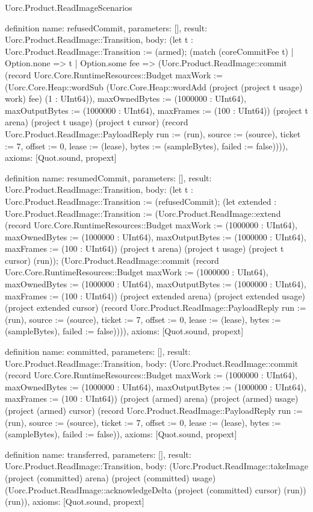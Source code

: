\begin{lexlean}{Uorc.Product.ReadImageScenarios}
\begin{semanticmodule}
definition{
  name: refusedCommit,
  parameters: [],
  result: Uorc.Product.ReadImage::Transition,
  body: (let t : Uorc.Product.ReadImage::Transition := (armed); (match (coreCommitFee t)
    | Option.none => t
    | Option.some fee => (Uorc.Product.ReadImage::commit (record Uorc.Core.RuntimeResources::Budget {maxWork := (Uorc.Core.Heap::wordSub (Uorc.Core.Heap::wordAdd (project (project t usage) work) fee) (1 : UInt64)), maxOwnedBytes := (1000000 : UInt64), maxOutputBytes := (1000000 : UInt64), maxFrames := (100 : UInt64)}) (project t arena) (project t usage) (project t cursor) (record Uorc.Product.ReadImage::PayloadReply {run := (run), source := (source), ticket := 7, offset := 0, lease := (lease), bytes := (sampleBytes), failed := false})))),
  axioms: [Quot.sound, propext]
}

definition{
  name: resumedCommit,
  parameters: [],
  result: Uorc.Product.ReadImage::Transition,
  body: (let t : Uorc.Product.ReadImage::Transition := (refusedCommit); (let extended : Uorc.Product.ReadImage::Transition := (Uorc.Product.ReadImage::extend (record Uorc.Core.RuntimeResources::Budget {maxWork := (1000000 : UInt64), maxOwnedBytes := (1000000 : UInt64), maxOutputBytes := (1000000 : UInt64), maxFrames := (100 : UInt64)}) (project t arena) (project t usage) (project t cursor) (run)); (Uorc.Product.ReadImage::commit (record Uorc.Core.RuntimeResources::Budget {maxWork := (1000000 : UInt64), maxOwnedBytes := (1000000 : UInt64), maxOutputBytes := (1000000 : UInt64), maxFrames := (100 : UInt64)}) (project extended arena) (project extended usage) (project extended cursor) (record Uorc.Product.ReadImage::PayloadReply {run := (run), source := (source), ticket := 7, offset := 0, lease := (lease), bytes := (sampleBytes), failed := false})))),
  axioms: [Quot.sound, propext]
}

definition{
  name: committed,
  parameters: [],
  result: Uorc.Product.ReadImage::Transition,
  body: (Uorc.Product.ReadImage::commit (record Uorc.Core.RuntimeResources::Budget {maxWork := (1000000 : UInt64), maxOwnedBytes := (1000000 : UInt64), maxOutputBytes := (1000000 : UInt64), maxFrames := (100 : UInt64)}) (project (armed) arena) (project (armed) usage) (project (armed) cursor) (record Uorc.Product.ReadImage::PayloadReply {run := (run), source := (source), ticket := 7, offset := 0, lease := (lease), bytes := (sampleBytes), failed := false})),
  axioms: [Quot.sound, propext]
}

definition{
  name: transferred,
  parameters: [],
  result: Uorc.Product.ReadImage::Transition,
  body: (Uorc.Product.ReadImage::takeImage (project (committed) arena) (project (committed) usage) (Uorc.Product.ReadImage::acknowledgeDelta (project (committed) cursor) (run)) (run)),
  axioms: [Quot.sound, propext]
}


\end{semanticmodule}
\end{lexlean}
